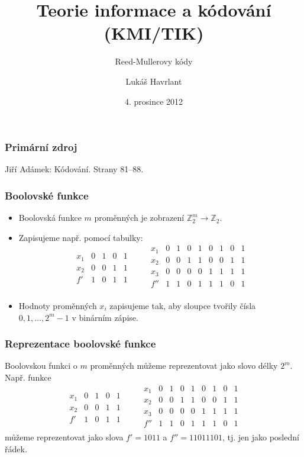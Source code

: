 \documentclass{beamer}
\title{Teorie informace a kódování (KMI/TIK)}
\subtitle{Reed-Mullerovy kódy}
\author{Lukáš Havrlant}
\date{4. prosince 2012}
\institute{Univerzita Palackého}
\newcommand{\cela}{\mathbb{Z}}
\newenvironment{itemizex}%
  {\large \begin{itemize}%
    \setlength{\itemsep}{8pt}%
    \setlength{\parskip}{8pt}}%
  {\end{itemize}}
\begin{document}
\begin{frame}[t,plain]
\titlepage
\end{frame}


\begin{frame}[t,fragile]\frametitle{Primární zdroj} 
Jiří Adámek: Kódování. Strany 81--88.
\end{frame}


\begin{frame}[t,fragile]\frametitle{Boolovské funkce} 
    \begin{itemizex}
        \item Boolovská funkce $m$ proměnných je zobrazení $\cela_2^m\longrightarrow\cela_2$.
        \item Zapisujeme např. pomocí tabulky:
$$\begin{array}{l|cccc}
x_1&0&1&0&1\\
x_2&0&0&1&1\\\hline
f'&1&0&1&1
\end{array}
\qquad
\begin{array}{l|cccccccc}
x_1&0&1&0&1&0&1&0&1\\
x_2&0&0&1&1&0&0&1&1\\
x_3&0&0&0&0&1&1&1&1\\\hline
f''&1&1&0&1&1&1&0&1\\
\end{array}$$
        \item Hodnoty proměnných $x_i$ zapisujeme tak, aby sloupce tvořily čísla $0,1,\dots,2^m-1$ v binárním zápise.
    \end{itemizex}
\end{frame}


\begin{frame}[t,fragile]\frametitle{Reprezentace boolovské funkce} 

Boolovskou funkci o $m$ proměnných můžeme reprezentovat jako slovo délky $2^m$. Např. funkce
$$\begin{array}{l|cccc}
x_1&0&1&0&1\\
x_2&0&0&1&1\\\hline
f'&1&0&1&1
\end{array}
\qquad
\begin{array}{l|cccccccc}
x_1&0&1&0&1&0&1&0&1\\
x_2&0&0&1&1&0&0&1&1\\
x_3&0&0&0&0&1&1&1&1\\\hline
f''&1&1&0&1&1&1&0&1\\
\end{array}$$
        můžeme reprezentovat jako slova $f'=1011$ a $f''=11011101$, tj. jen jako poslední řádek. 

\end{frame}
\end{document}
